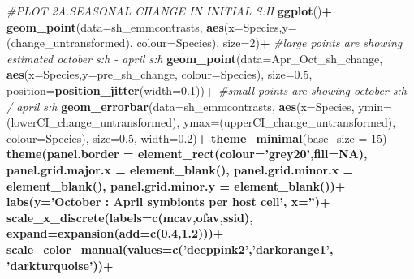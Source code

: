 \documentclass[]{article}
\newenvironment{Shaded}{\begin{snugshade}}{\end{snugshade}}
\newcommand{\CommentTok}[1]{\textcolor[rgb]{0.56,0.35,0.01}{\textit{#1}}}
\newcommand{\DataTypeTok}[1]{\textcolor[rgb]{0.13,0.29,0.53}{#1}}
\newcommand{\DecValTok}[1]{\textcolor[rgb]{0.00,0.00,0.81}{#1}}
\newcommand{\FloatTok}[1]{\textcolor[rgb]{0.00,0.00,0.81}{#1}}
\newcommand{\KeywordTok}[1]{\textcolor[rgb]{0.13,0.29,0.53}{\textbf{#1}}}
\newcommand{\NormalTok}[1]{#1}
\newcommand{\OperatorTok}[1]{\textcolor[rgb]{0.81,0.36,0.00}{\textbf{#1}}}
\newcommand{\OtherTok}[1]{\textcolor[rgb]{0.56,0.35,0.01}{#1}}
\newcommand{\StringTok}[1]{\textcolor[rgb]{0.31,0.60,0.02}{#1}}
\begin{document}
\begin{Shaded}
\begin{Highlighting}[]
{{\CommentTok{#PLOT 2A.SEASONAL CHANGE IN INITIAL S:H}
\KeywordTok{ggplot}\NormalTok{()}\OperatorTok{+}
\StringTok{  }\KeywordTok{geom_point}\NormalTok{(}\DataTypeTok{data=}\NormalTok{sh_emmcontrasts, }\KeywordTok{aes}\NormalTok{(}\DataTypeTok{x=}\NormalTok{Species,}\DataTypeTok{y=}\NormalTok{(change_untransformed), }\DataTypeTok{colour=}\NormalTok{Species), }\DataTypeTok{size=}\DecValTok{2}\NormalTok{)}\OperatorTok{+}\StringTok{ }\CommentTok{#large points are showing estimated october s:h - april s:h}
\StringTok{  }\KeywordTok{geom_point}\NormalTok{(}\DataTypeTok{data=}\NormalTok{Apr_Oct_sh_change, }\KeywordTok{aes}\NormalTok{(}\DataTypeTok{x=}\NormalTok{Species,}\DataTypeTok{y=}\NormalTok{pre_sh_change, }\DataTypeTok{colour=}\NormalTok{Species), }\DataTypeTok{size=}\FloatTok{0.5}\NormalTok{,  }\DataTypeTok{position=}\KeywordTok{position_jitter}\NormalTok{(}\DataTypeTok{width=}\FloatTok{0.1}\NormalTok{))}\OperatorTok{+}\StringTok{ }\CommentTok{#small points are showing october s:h / april s:h}
\StringTok{  }\KeywordTok{geom_errorbar}\NormalTok{(}\DataTypeTok{data=}\NormalTok{sh_emmcontrasts, }\KeywordTok{aes}\NormalTok{(}\DataTypeTok{x=}\NormalTok{Species, }\DataTypeTok{ymin=}\NormalTok{(lowerCI_change_untransformed), }\DataTypeTok{ymax=}\NormalTok{(upperCI_change_untransformed), }\DataTypeTok{colour=}\NormalTok{Species), }\DataTypeTok{size=}\FloatTok{0.5}\NormalTok{, }\DataTypeTok{width=}\FloatTok{0.2}\NormalTok{)}\OperatorTok{+}
\StringTok{  }\KeywordTok{theme_minimal}\NormalTok{(}\DataTypeTok{base_size =} \DecValTok{15}\NormalTok{)}\OperatorTok{%+replace%}
\StringTok{    }\KeywordTok{theme}\NormalTok{(}\DataTypeTok{panel.border =} \KeywordTok{element_rect}\NormalTok{(}\DataTypeTok{colour=}\StringTok{'grey20'}\NormalTok{,}\DataTypeTok{fill=}\OtherTok{NA}\NormalTok{),}
          \DataTypeTok{panel.grid.major.x =} \KeywordTok{element_blank}\NormalTok{(),}
          \DataTypeTok{panel.grid.minor.x =} \KeywordTok{element_blank}\NormalTok{(),}
          \DataTypeTok{panel.grid.minor.y =} \KeywordTok{element_blank}\NormalTok{())}\OperatorTok{+}
\StringTok{  }\KeywordTok{labs}\NormalTok{(}\DataTypeTok{y=}\StringTok{'October : April symbionts per host cell'}\NormalTok{, }\DataTypeTok{x=}\StringTok{''}\NormalTok{)}\OperatorTok{+}
\StringTok{   }\KeywordTok{scale_x_discrete}\NormalTok{(}\DataTypeTok{labels=}\KeywordTok{c}\NormalTok{(mcav,ofav,ssid), }\DataTypeTok{expand=}\KeywordTok{expansion}\NormalTok{(}\DataTypeTok{add=}\KeywordTok{c}\NormalTok{(}\FloatTok{0.4}\NormalTok{,}\FloatTok{1.2}\NormalTok{)))}\OperatorTok{+}
\StringTok{  }\KeywordTok{scale_color_manual}\NormalTok{(}\DataTypeTok{values=}\KeywordTok{c}\NormalTok{(}\StringTok{'deeppink2'}\NormalTok{,}\StringTok{'darkorange1'}\NormalTok{, }\StringTok{'darkturquoise'}\NormalTok{))}\OperatorTok{+}
}}}
\end{Highlighting}
\end{Shaded}
\end{document}
